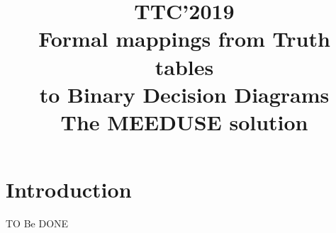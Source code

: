 \documentclass[a4wide]{article}
\begin{document}
\title{TTC'2019\\Formal mappings from Truth tables \\to Binary Decision Diagrams\\ \bigskip The MEEDUSE solution}

\maketitle

\section{Introduction}

TO Be DONE
\end{document}
